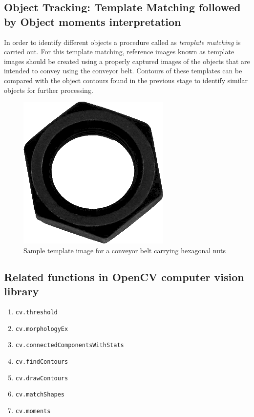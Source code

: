 \documentclass[a4paper,12pt]{book}%
\begin{document}
\subsection{Object Tracking: Template Matching followed by Object moments interpretation}

In order to identify different objects a procedure called as \textit{template matching} is carried out. For this template matching, reference images known as template images should be created using a properly captured images of the objects that are intended to convey using the conveyor belt. Contours of these templates can be compared with the object contours found in the previous stage to identify similar objects for further processing. 

\begin{figure}[H]
	\centering
	\includegraphics[scale=0.45]{figures/template}
	\caption{Sample template image for a conveyor belt carrying hexagonal nuts}
\end{figure}

\subsection{Related functions in OpenCV computer vision library}
\begin{enumerate}[1.]
	\item {\tt cv.threshold}
	\item {\tt cv.morphologyEx}
	\item {\tt cv.connectedComponentsWithStats}
	\item {\tt cv.findContours}
	\item {\tt cv.drawContours}
	\item {\tt cv.matchShapes}
	\item {\tt cv.moments}
	
	
\end{enumerate}
\end{document}

